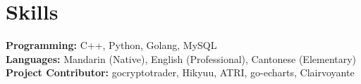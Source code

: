 \documentclass[letterpaper,11pt]{article}
\makeatletter
\newcommand{\resumeOrganizationHeading}[4]{
  \vspace{-2pt}\item
    \begin{tabular*}{0.97\textwidth}[t]{l@{\extracolsep{\fill}}r}
      \textbf{#1} & \textit{\small #2} \\
      \textit{\small#3}
    \end{tabular*}\vspace{-7pt}
}
\newcommand{\resumeSubHeadingListStart}{\begin{itemize}[leftmargin=0.15in, label={}]}
\newcommand{\resumeSubHeadingListEnd}{\end{itemize}}
\makeatother
\begin{document}

\section{Skills}
  \vspace{2pt}
  \resumeSubHeadingListStart
    \small{\item{
        \textbf{Programming:}{ C++, Python, Golang, MySQL} \\ \vspace{3pt}
        \textbf{Languages:}{ Mandarin (Native), English (Professional), Cantonese (Elementary)} \\ \vspace{3pt}
        \textbf{Project Contributor:}{ gocryptotrader, Hikyuu, ATRI, go-echarts, Clairvoyante} \\
    }}
  \resumeSubHeadingListEnd




    
    




    
    








    



\end{document}
